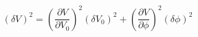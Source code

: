 \begin{equation}
\label{eq:deltaV}
\left(\delta V\right)^2 = \left( \frac{\partial{V}}{\partial{V_0}}\right)^2 (\delta V_0)^2 + \left( \frac{\partial{V}}{\partial{\phi}}\right)^2 (\delta \phi)^2 
\end{equation}
